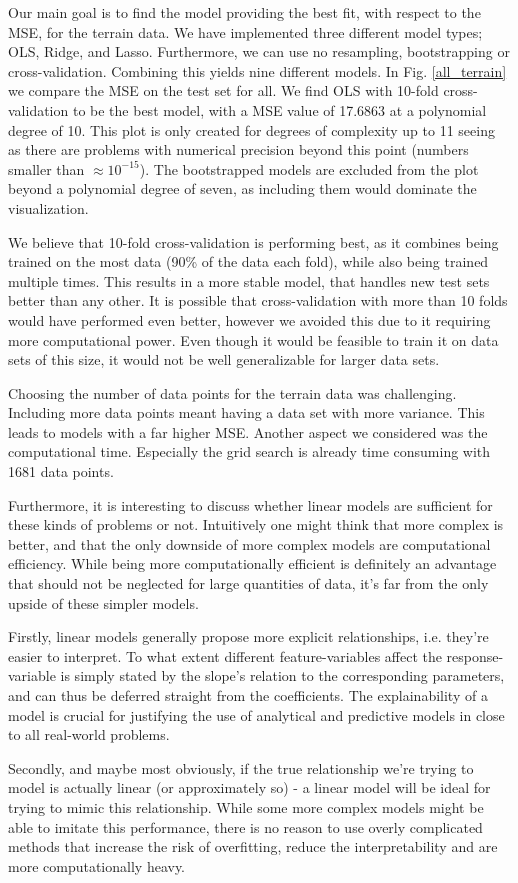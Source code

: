 Our main goal is to find the model providing the best fit, with respect to the MSE, for the terrain data.
We have implemented three different model types; OLS, Ridge, and Lasso. 
Furthermore, we can use no resampling, bootstrapping or cross-validation. 
Combining this yields nine different models. In Fig. \ref{all_terrain} we compare the MSE on the test set for all. 
We find OLS with 10-fold cross-validation to be the best model, with a MSE value of 17.6863 at a polynomial degree of 10.
This plot is only created for degrees of complexity up to 11 seeing as there are problems with numerical precision beyond this point (numbers smaller than $\approx 10^{-15}$).
The bootstrapped models are excluded from the plot beyond a polynomial degree of seven, as including them would dominate the visualization.

We believe that 10-fold cross-validation is performing best, as it combines being trained on the most data (90\% of the data each fold), while also being trained multiple times. 
This results in a more stable model, that handles new test sets better than any other.
It is possible that cross-validation with more than 10 folds would have performed even better, however we avoided this due to it requiring more computational power.
Even though it would be feasible to train it on data sets of this size, it would not be well generalizable for larger data sets.

Choosing the number of data points for the terrain data was challenging. Including more data points meant having a data set with more variance. This leads to models with a far higher MSE. 
Another aspect we considered was the computational time. Especially the grid search is already time consuming with 1681 data points. 


Furthermore, it is interesting to discuss whether linear models are sufficient for these kinds of problems or not. Intuitively one might think that more complex is better, and that the only downside of more complex models are computational efficiency. While being more computationally efficient is definitely an advantage that should not be neglected for large quantities of data, it's far from the only upside of these simpler models. 
 
Firstly, linear models generally propose more explicit relationships, i.e. they're easier to interpret. To what extent different feature-variables affect the response-variable is simply stated by the slope's relation to the corresponding parameters, and can thus be deferred straight from the coefficients. The explainability of a model is crucial for justifying the use of analytical and predictive models in close to all real-world problems. 

Secondly, and maybe most obviously, if the true relationship we're trying to model is actually linear (or approximately so) - a linear model will be ideal for trying to mimic this relationship. While some more complex models might be able to imitate this performance, there is no reason to use overly complicated methods that increase the risk of overfitting, reduce the interpretability and are more computationally heavy. 